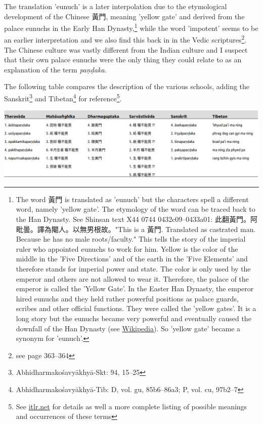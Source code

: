 The translation 'eunuch' is a later interpolation due to the etymological development of the Chinese 黃門, meaning 'yellow gate' and derived from the palace eunuchs in the Early Han Dynasty,\footnote{The word 黃門 is translated as 'eunuch' but the characters spell a different word, namely 'yellow gate'. The etymology of the word can be traced back to the Han Dynasty. See Shinsan text X44 0744 0432c09–0433a01: 此翻黃門。阿毗曇。譯為閹人。以無男根故。"This is a 黃門. Translated as castrated man. Because he has no male roots/faculty." This tells the story of the imperial ruler who appointed eunuchs to work for him. Yellow is the color of the middle in the 'Five Directions' and of the earth in the 'Five Elements' and therefore stands for imperial power and state. The color is only used by the emperor and others are not allowed to wear it. Therefore, the palace of the emperor is called the 'Yellow Gate'. In the Easter Han Dynasty, the emperor hired eunuchs and they held rather powerful positions as palace guards, scribes and other official functions. They were called the 'yellow gates'. It is a long story but the eunuchs became very powerful and eventually caused the downfall of the Han Dynasty (see \href{https://en.wikipedia.org/wiki/Han_dynasty}{Wikipedia}). So 'yellow gate' became a synonym for 'eunuch'.} while the word 'impotent' seems to be an earlier interpretation and we also find this back in in the Vedic scriptures\footnote{see \cite{zwilling} page 363–364}. The Chinese culture was vastly different from the Indian culture and I suspect that their own palace eunuchs were the only thing they could relate to as an explanation of the term {\em paṇḍaka}.

The following table compares the description of the various schools, adding the Sanskrit\footnote{Abhidharmakośavyākhyā-Skt: 94, 15–25} and Tibetan\footnote{Abhidharmakośavyākhyā-Tib: D, vol. gu, 85b6–86a3; P, vol. cu, 97b2–7} for reference\footnote{See \href{http://www.itlr.net/hwid:281142}{itlr.net} for details as well a more complete listing of possible meanings and occurrences of these terms}.

\bigskip
\includegraphics[width=\linewidth]{pandaka.jpg}
\label{pandaka}
\medskip

